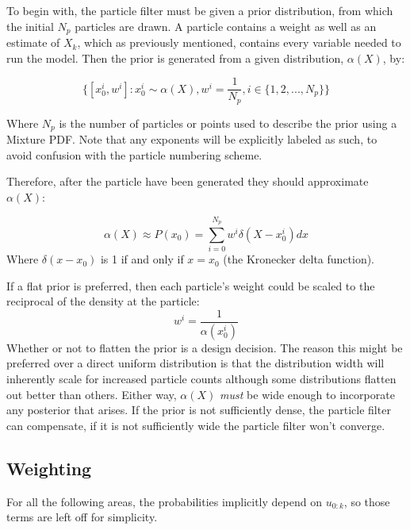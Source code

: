 To begin with, the particle filter must be given a prior distribution, from
which the initial $N_p$ particles are drawn. A particle contains a weight
as well as an estimate of $X_k$, which as previously mentioned, contains every
variable needed to run the model. Then the prior is generated from a 
given distribution, $\alpha(X)$, by:

\begin{equation}
\{[x^i_0,w^i] : x^i_0 \sim \alpha(X), w^i = \frac{1}{N_p}, i \in \{1, 2, ... , N_p\} \}
\end{equation}

Where $N_p$ is the number of particles or points used to describe the prior 
using a Mixture PDF. 
Note that any exponents will be explicitly labeled as such, to avoid confusion with
the particle numbering scheme. 

Therefore, after the particle have been generated they should approximate $\alpha(X)$:

\begin{equation}
\alpha(X) \approx P(x_0) = \sum_{i=0}^{N_p} w^i\delta(X - x^i_0 ) dx
\end{equation}
Where $\delta(x-x_0)$ is 1 if and only if $x = x_0$ (the Kronecker delta function).

If a flat prior is 
preferred, then each particle's weight could be scaled to the reciprocal of the
density at the particle: 
\begin{equation}
w^i = \frac{1}{\alpha(x^i_0)}
\end{equation}
Whether or not to flatten the prior is a design decision. The reason this might 
be preferred over a direct
uniform distribution is that the distribution width will inherently scale 
for increased particle counts although some distributions
flatten out better than others. Either way, $\alpha(X)$ \emph{must} be
wide enough to incorporate any posterior that arises. If the prior is
not sufficiently dense, the particle filter can compensate, if it is
not sufficiently wide the particle filter won't converge. 

\subsection{Weighting}
For all the following areas, the probabilities implicitly depend on $u_{0:k}$, 
so those terms are left off for simplicity.

